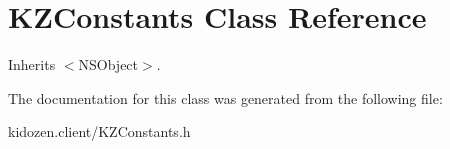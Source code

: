 \hypertarget{interface_k_z_constants}{\section{K\-Z\-Constants Class Reference}
\label{interface_k_z_constants}
}


Inherits $<$\-N\-S\-Object$>$.



The documentation for this class was generated from the following file\-:\begin{DoxyCompactItemize}
\item 
kidozen.\-client/K\-Z\-Constants.\-h\end{DoxyCompactItemize}
